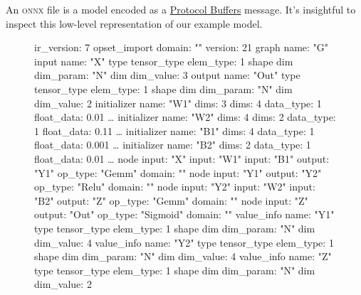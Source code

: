 \documentclass{article}
\begin{document}
An \textsc{onnx} file is a model encoded as a \href{https://protobuf.dev/}{Protocol Buffers} message.
It's insightful to inspect this low-level representation of our example model.

\begin{figure}
\begin{code}
ir_version: 7
opset_import {
  domain: ""
  version: 21
}
graph {
  name: "G"
  input {
    name: "X"
    type {
      tensor_type {
        elem_type: 1
        shape {
          dim { dim_param: "N" }
          dim { dim_value: 3 }
        }
      }
    }
  }
  output {
    name: "Out"
    type {
      tensor_type {
        elem_type: 1
        shape {
          dim { dim_param: "N" }
          dim { dim_value: 2 }
        }
      }
    }
  }
  initializer {
    name: "W1"
    dims: 3
    dims: 4
    data_type: 1
    float_data: 0.01
    \ldots
  }
  initializer {
    name: "W2"
    dims: 4
    dims: 2
    data_type: 1
    float_data: 0.11
    \ldots
  }
  initializer {
    name: "B1"
    dims: 4
    data_type: 1
    float_data: 0.001
    \ldots
  }
  initializer {
    name: "B2"
    dims: 2
    data_type: 1
    float_data: 0.01
    \ldots
  }
  node {
    input: "X"
    input: "W1"
    input: "B1"
    output: "Y1"
    op_type: "Gemm"
    domain: ""
  }
  node {
    input: "Y1"
    output: "Y2"
    op_type: "Relu"
    domain: ""
  }
  node {
    input: "Y2"
    input: "W2"
    input: "B2"
    output: "Z"
    op_type: "Gemm"
    domain: ""
  }
  node {
    input: "Z"
    output: "Out"
    op_type: "Sigmoid"
    domain: ""
  }
  value_info {
    name: "Y1"
    type {
      tensor_type {
        elem_type: 1
        shape {
          dim { dim_param: "N" }
          dim { dim_value: 4 }
        }
      }
    }
  }
  value_info {
    name: "Y2"
    type {
      tensor_type {
        elem_type: 1
        shape {
          dim { dim_param: "N" }
          dim { dim_value: 4 }
        }
      }
    }
  }
  value_info {
    name: "Z"
    type {
      tensor_type {
        elem_type: 1
        shape {
          dim { dim_param: "N" }
          dim { dim_value: 2 }
        }
      }
    }
  }
}
\end{code}
\end{figure}
\end{document}
